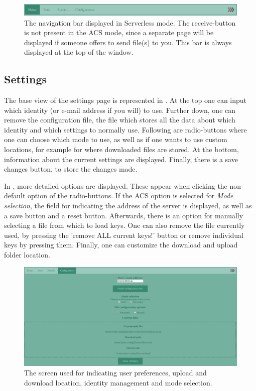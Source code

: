	\begin{figure}[H]
		  \centering
		  \includegraphics[width=\textwidth]{Figures/Base/navbar_sl}
		  \decoRule
		  \caption[Navigation bar (Serverless mode)]{The navigation bar displayed in Serverless mode. The receive-button is not present in the ACS mode, since a separate page will be displayed if someone offers to send file(s) to you. This bar is always displayed at the top of the window.}
		  \label{fig:hs_nb}
		\end{figure}
	\subsection{Settings}
		The base view of the settings page is represented in . At the top one can input which identity (or e-mail address if you will) to use. Further down, one can remove the configuration file, the file which stores all the data about which identity and which settings to normally use. Following are radio-buttons where one can choose which mode to use, as well as if one wants to use custom locations, for example for where downloaded files are stored. At the bottom, information about the current settings are displayed. Finally, there is a save changes button, to store the changes made.

		In , more detailed options are displayed. These appear when clicking the non-default option of the radio-buttons. If the ACS option is selected for \emph{Mode selection}, the field for indicating the address of the server is displayed, as well as a save button and a reset button. Afterwards, there is an option for manually selecting a file from which to load keys. One can also remove the file currently used, by pressing the 'remove ALL current keys!' button or remove individual keys by pressing them. Finally, one can customize the download and upload folder location.
		\begin{figure}[H]
		  \centering
		  \includegraphics[width=\textwidth]{Figures/Base/Settings}
		  \decoRule
		  \caption[Settings screen]{The screen used for indicating user preferences,  upload and download location, identity management and mode selection.}
		  \label{fig:sett}
		\end{figure}

